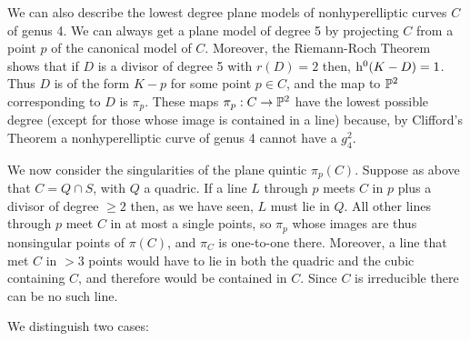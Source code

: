 We can also describe the lowest degree plane models of nonhyperelliptic curves $C$ of genus 4. 
We can always get a plane model of degree 5 by projecting $C$ from a point $p$ of the canonical model of $C$. Moreover, the Riemann-Roch Theorem shows that if $D$ is a divisor of degree 5 with $r(D)=2$ then,  $\h^0(K-D) = 1$. Thus $D$ is of the form $K-p$ for some point $p \in C$, and the map to $\PP^2$ corresponding to $D$ is $\pi_p$. These  maps $\pi_p: C\to \PP^2$ have the lowest possible degree (except for those whose image is  contained in a line) because, by Clifford's Theorem a nonhyperelliptic curve of genus 4 cannot have a $g^2_4$.

We now consider the singularities of the plane quintic $\pi_p(C)$. Suppose as above that $C = Q\cap S$, with $Q$ a quadric. If a line $L$ through $p$ meets $C$ in $p$ plus a divisor of degree $\geq 2$ then, as we have seen, $L$ must lie in $Q$.  All other lines through $p$ meet $C$ in at most a single points, so $\pi_p$ whose images are thus nonsingular points of $\pi(C)$, and $\pi_C$ is one-to-one there. Moreover, a line that met $C$ in $>3$ points would have to lie in both the quadric and the cubic containing $C$, and therefore would be contained in $C$. Since $C$ is irreducible there can be no such line.

We distinguish two cases:

